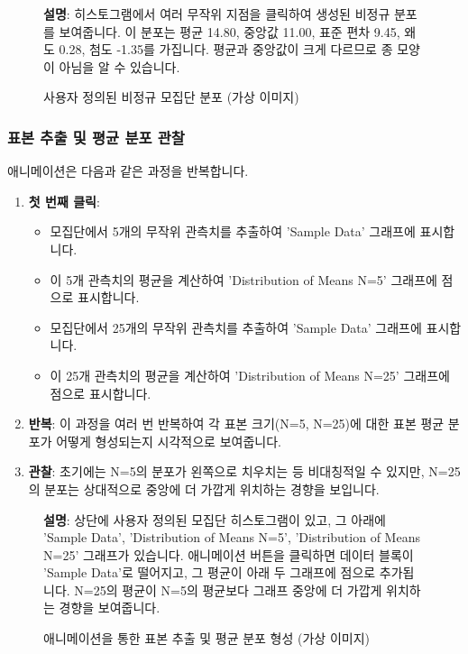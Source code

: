 \documentclass[11pt,a4paper]{article}
\theoremstyle{definition}
\begin{document}
\begin{figure}[h!]
    \centering
    \caption{사용자 정의된 비정규 모집단 분포 (가상 이미지)}
    \label{fig:custom_pop}
    \textbf{설명}: 히스토그램에서 여러 무작위 지점을 클릭하여 생성된 비정규 분포를 보여줍니다. 이 분포는 평균 14.80, 중앙값 11.00, 표준 편차 9.45, 왜도 0.28, 첨도 -1.35를 가집니다. 평균과 중앙값이 크게 다르므로 종 모양이 아님을 알 수 있습니다.
\end{figure}

\subsubsection*{표본 추출 및 평균 분포 관찰}

애니메이션은 다음과 같은 과정을 반복합니다.
\begin{enumerate}
    \item \textbf{첫 번째 클릭}:
    \begin{itemize}
        \item 모집단에서 5개의 무작위 관측치를 추출하여 'Sample Data' 그래프에 표시합니다.
        \item 이 5개 관측치의 평균을 계산하여 'Distribution of Means N=5' 그래프에 점으로 표시합니다.
        \item 모집단에서 25개의 무작위 관측치를 추출하여 'Sample Data' 그래프에 표시합니다.
        \item 이 25개 관측치의 평균을 계산하여 'Distribution of Means N=25' 그래프에 점으로 표시합니다.
    \end{itemize}
    \item \textbf{반복}: 이 과정을 여러 번 반복하여 각 표본 크기(N=5, N=25)에 대한 표본 평균 분포가 어떻게 형성되는지 시각적으로 보여줍니다.
    \item \textbf{관찰}: 초기에는 N=5의 분포가 왼쪽으로 치우치는 등 비대칭적일 수 있지만, N=25의 분포는 상대적으로 중앙에 더 가깝게 위치하는 경향을 보입니다.
\end{enumerate}

\begin{figure}[h!]
    \centering
    \caption{애니메이션을 통한 표본 추출 및 평균 분포 형성 (가상 이미지)}
    \label{fig:animation_step}
    \textbf{설명}: 상단에 사용자 정의된 모집단 히스토그램이 있고, 그 아래에 'Sample Data', 'Distribution of Means N=5', 'Distribution of Means N=25' 그래프가 있습니다. 애니메이션 버튼을 클릭하면 데이터 블록이 'Sample Data'로 떨어지고, 그 평균이 아래 두 그래프에 점으로 추가됩니다. N=25의 평균이 N=5의 평균보다 그래프 중앙에 더 가깝게 위치하는 경향을 보여줍니다.
\end{figure}
\end{document}
